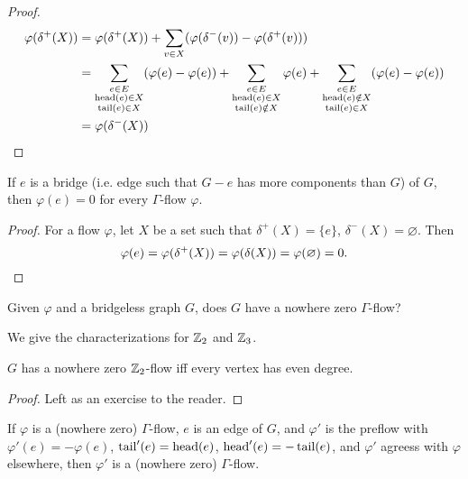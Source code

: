 \documentclass[main.tex]{subfiles}
\begin{document}
\begin{proof}
  \leavevmode\vspace{-0.25em}
  \begin{align*}
    \varphi(\delta^+(X))
    &= \varphi(\delta^+(X)) + \sum_{v \in X} (\varphi(\delta^-(v)) - \varphi(\delta^+(v))) \\
    &= \sum_{\substack{e\in E\\\operatorname{head}(e)\in X\\\operatorname{tail}(e)\in X}}
          (\varphi(e) - \varphi(e))
    + \sum_{\substack{e\in E\\\operatorname{head}(e)\in X\\\operatorname{tail}(e)\notin X}} \varphi(e)
    + \sum_{\substack{e\in E\\\operatorname{head}(e)\notin X\\\operatorname{tail}(e)\in X}}
          (\varphi(e) - \varphi(e))\\
    &= \varphi(\delta^-(X)) \qedhere
  \end{align*}
\end{proof}
\begin{corollary}
  If $e$ is a bridge (i.e. edge such that $G-e$ has more components than $G$)
  of $G$, then $\varphi(e) = 0$ for every $\Gamma$-flow $\varphi$.
\end{corollary}
\begin{proof}
  For a flow $\varphi$, let $X$ be a set such that $\delta^+(X)  = \{e\}$,
  $\delta^-(X) = \varnothing$.
  Then
  \[
    \varphi(e) = \varphi(\delta^+(X)) = \varphi(\delta(X)) = \varphi(\varnothing)= 0.
    \qedhere
  \]
\end{proof}
\begin{question*}
  Given $\varphi$ and a bridgeless graph $G$, does $G$ have a nowhere zero
  $\Gamma$-flow?
\end{question*}
We give the characterizations for $\mathbb Z_2$ and $\mathbb Z_3$.
\begin{proposition}
  $G$ has a nowhere zero $\mathbb Z_2$-flow iff every vertex has even degree.
\end{proposition}
\begin{proof}
  Left as an exercise to the reader.
\end{proof}
\begin{lemma}
  If $\varphi$ is a (nowhere zero) $\Gamma$-flow, $e$ is an edge of $G$,
  and $\varphi'$ is the preflow with $\varphi'(e) = -\varphi(e)$,
  $\operatorname{tail}'(e) = \operatorname{head}(e)$, $\operatorname{head}'(e) = -\operatorname{tail}(e)$,
  and $\varphi'$ agreess with $\varphi$ elsewhere, then $\varphi'$ is a (nowhere zero)
  $\Gamma$-flow.
\end{lemma}
\end{document}
